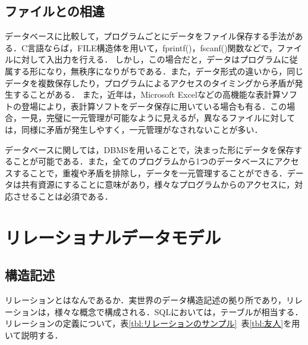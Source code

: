 \documentclass[a4paper,10pt]{jreport}
\begin{document}
\section{ファイルとの相違}
データベースに比較して，プログラムごとにデータをファイル保存する手法がある．C言語ならば，FILE構造体を用いて，fprintf()，fscanf()関数などで，ファイルに対して入出力を行える．
しかし，この場合だと，データはプログラムに従属する形になり，無秩序になりがちである．また，データ形式の違いから，同じデータを複数保存したり，プログラムによるアクセスのタイミングから矛盾が発生することがある．
また，近年は，Microsoft Excelなどの高機能な表計算ソフトの登場により，表計算ソフトをデータ保存に用いている場合も有る．この場合，一見，完璧に一元管理が可能なように見えるが，異なるファイルに対しては，同様に矛盾が発生しやすく，一元管理がなされないことが多い．
\par データベースに関しては，DBMSを用いることで，決まった形にデータを保存することが可能である．また，全てのプログラムから1つのデータベースにアクセスすることで，重複や矛盾を排除し，データを一元管理することができる．データは共有資源にすることに意味があり，様々なプログラムからのアクセスに，対応させることは必須である．


\chapter{リレーショナルデータモデル} %
\label{cha:リレーショナルデータモデル}
\section{構造記述}
リレーションとはなんであるか．実世界のデータ構造記述の拠り所であり，リレーションは，様々な概念で構成される．SQLにおいては，テーブルが相当する．リレーションの定義について，表\ref{tbl:リレーションのサンプル}~表\ref{tbl:友人}を用いて説明する．
\end{document}
